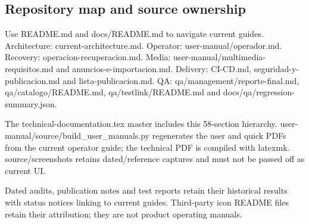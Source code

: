 \subsection{Repository map and source ownership}

Use README.md and docs/README.md to navigate current guides. Architecture: current-architecture.md. Operator: user-manual/operador.md. Recovery: operacion-recuperacion.md. Media: user-manual/multimedia-requisitos.md and anuncios-e-importacion.md. Delivery: CI-CD.md, seguridad-y-publicacion.md and lista-publicacion.md. QA: qa/management/reporte-final.md, qa/catalogo/README.md, qa/testlink/README.md and docs/qa/regression-summary.json.

The technical-documentation.tex master includes this 58-section hierarchy. user-manual/source/build\_user\_manuals.py regenerates the user and quick PDFs from the current operator guide; the technical PDF is compiled with latexmk. source/screenshots retains dated/reference captures and must not be passed off as current UI.

Dated audits, publication notes and test reports retain their historical results with status notices linking to current guides. Third-party icon README files retain their attribution; they are not product operating manuals.
